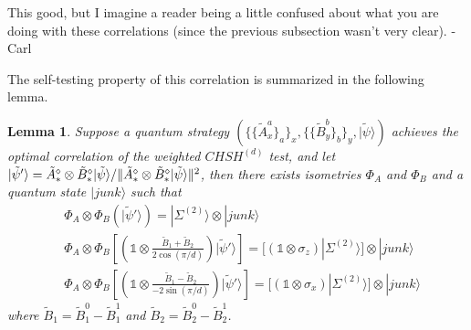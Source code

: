 \documentclass[11pt,letterpaper]{article}
\newcommand{\ket}[1]{|#1\rangle}
\newcommand{\x}{\otimes}
\DeclarePairedDelimiter{\norm}{\lVert}{\rVert}
\newcommand{\1}{\mathbb{1}}
\newcommand{\CHSH}{CHSH^{(d)}}
\newcommand{\EPR}[1]{\Sigma^{(#1)}}
\newcommand{\paulix}{\sigma_x}
\newcommand{\pauliz}{\sigma_z}
\newcommand{\tA}{\tilde{A}}
\newcommand{\tB}{\tilde{B}}
\newcommand{\tpsi}{\tilde{\psi}}
\def\carl#1{{\color{blue} #1 -Carl}}
\newtheorem{lemma}[theorem]{Lemma}
\theoremstyle{definition}
\begin{document}
\carl{This good, but I imagine a reader being a little confused about what you are doing
with these correlations (since the previous subsection wasn't very clear).}

The self-testing property of this correlation is summarized in the following lemma.
\begin{lemma}
	\label{lm:chsh_comp}
	Suppose a quantum strategy $\left(\{\{\tA_x^a\}_a\}_x, \{\{\tB_y^b\}_b\}_y, \ket{\tpsi}\right)$
	achieves the optimal correlation of the weighted $\CHSH$ test, 
	and let $\ket{\tpsi'} = \tA_\ast^\diamond \x \tB_\ast^\diamond \ket{\tpsi}/\norm{\tA_\ast^\diamond \x \tB_\ast^\diamond \ket{\tpsi}}^2$,
	then there exists isometries $\Phi_A$ and $\Phi_B$ 
	and a quantum state $\ket{junk}$
	such that 
	\begin{align*}
		&\Phi_A\x \Phi_B \left( \ket{\tpsi'}\right) = \ket{\EPR{2}}\x \ket{junk} \\
		&\Phi_A\x \Phi_B \left[\left(\1 \x  \frac{\tB_1 + \tB_2}{2\cos(\pi/d)}\right)\ket{\tpsi'}\right]
		=[(\1 \x \pauliz) \ket{\EPR{2}}] \x \ket{junk} \\
		&\Phi_A\x \Phi_B \left[\left(\1 \x  \frac{\tB_1 - \tB_2}{-2\sin(\pi/d)}\right)\ket{\tpsi'} \right]
		=[(\1 \x \paulix) \ket{\EPR{2}}] \x \ket{junk} 
	\end{align*}
	where $\tB_1 = \tB_1^0 - \tB_1^1$ and $\tB_2 = \tB_2^0 - \tB_2^1$.
\end{lemma}
\end{document}
